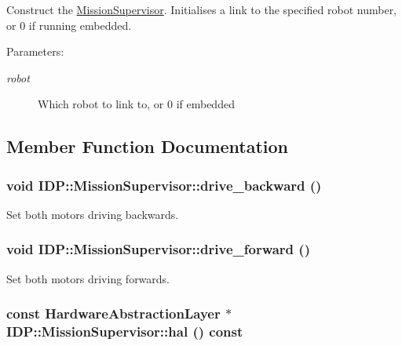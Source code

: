 Construct the \hyperlink{classIDP_1_1MissionSupervisor}{MissionSupervisor}. Initialises a link to the specified robot number, or 0 if running embedded. \begin{Desc}
\item[Parameters:]
\begin{description}
\item[{\em robot}]Which robot to link to, or 0 if embedded \end{description}
\end{Desc}


\subsection{Member Function Documentation}
\hypertarget{classIDP_1_1MissionSupervisor_e5d6e9a37417126da780583349b48d44}{
\subsubsection[{drive\_\-backward}]{\setlength{\rightskip}{0pt plus 5cm}void IDP::MissionSupervisor::drive\_\-backward ()}}
\label{classIDP_1_1MissionSupervisor_e5d6e9a37417126da780583349b48d44}


Set both motors driving backwards. \hypertarget{classIDP_1_1MissionSupervisor_f8c6a3073190a4479211753fe5f50a36}{
\subsubsection[{drive\_\-forward}]{\setlength{\rightskip}{0pt plus 5cm}void IDP::MissionSupervisor::drive\_\-forward ()}}
\label{classIDP_1_1MissionSupervisor_f8c6a3073190a4479211753fe5f50a36}


Set both motors driving forwards. \hypertarget{classIDP_1_1MissionSupervisor_e19d0c2123fda158cc45e649128fbc09}{
\subsubsection[{hal}]{\setlength{\rightskip}{0pt plus 5cm}const {\bf HardwareAbstractionLayer} $\ast$ IDP::MissionSupervisor::hal () const}}
\label{classIDP_1_1MissionSupervisor_e19d0c2123fda158cc45e649128fbc09}


